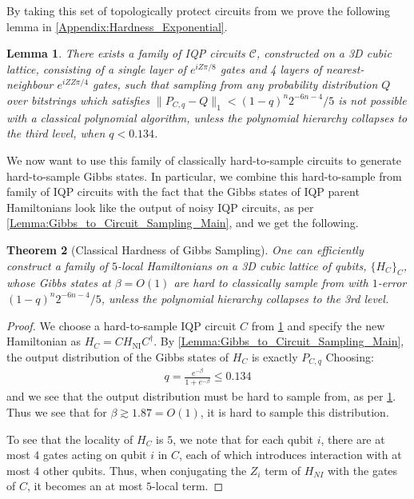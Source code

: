 \documentclass[a4paper,onecolumn,11pt,accepted=2017-05-09]{quantumarticle}
\newcommand{\HNI}{H_{\text{NI}}}
\newtheorem{theorem}{Theorem}
\newtheorem{lemma}[theorem]{Lemma}
\begin{document}
    
	By taking this set of topologically protect circuits from \citeauthor{fujii2016computational} we prove the following lemma in  \cref{Appendix:Hardness_Exponential}.
	\begin{lemma}  \label{Lemma:Hardness_Exponential}
		There exists a family of IQP circuits $\mathcal{C}$, constructed on a 3D cubic lattice, consisting of a single layer of $e^{iZ\pi/8}$ gates and 4 layers of nearest-neighbour $e^{iZZ\pi/4}$ gates, such that sampling from any probability distribution $Q$ over bitstrings which satisfies $\|P_{C,q}-Q\|_{1} < (1-q)^n2^{-6n-4}/5$ is not possible with a classical polynomial algorithm, unless the polynomial hierarchy collapses to the third level, when $q < 0.134$.
	\end{lemma}
 
	\noindent
    We now want to use this family of classically hard-to-sample circuits to generate hard-to-sample Gibbs states.
    In particular, we combine this hard-to-sample from family of IQP circuits with the fact that the Gibbs states of IQP parent Hamiltonians look like the output of noisy IQP circuits, as per \cref{Lemma:Gibbs_to_Circuit_Sampling_Main}, and we get the following.
 
	\begin{theorem}[Classical Hardness of Gibbs Sampling] \label{Theorem:4Local}
		One can efficiently construct a family of $5$-local Hamiltonians on a 3D cubic lattice of qubits, $\{ H_C\}_C$, whose Gibbs states at $\beta = O(1)$ are hard to classically sample from with $1$-error $(1-q)^n2^{-6n-4}/5$, unless the polynomial hierarchy collapses to the 3rd level.
	\end{theorem}
	\begin{proof}
		We choose a hard-to-sample IQP circuit $C$ from \cref{Lemma:Hardness_Exponential} and specify the new Hamiltonian as $H_C=C\HNI C^\dagger$. By \cref{Lemma:Gibbs_to_Circuit_Sampling_Main}, the output distribution of the Gibbs states of $H_C$ is exactly $P_{C,q}$
		Choosing:
		\begin{align} \label{Eq:Hardness_Condition}
			q = \frac{e^{-\beta}}{1+e^{-\beta}} \leq 0.134
		\end{align}
		and we see that the output distribution must be hard to sample from, as per \cref{Lemma:Hardness_Exponential}.
		Thus we see that for $\beta \gtrsim 1.87 =  O(1)$, it is hard to sample this distribution. 
  
    To see that the locality of $H_C$ is $5$, we note that for each qubit $i$, there are at most $4$ gates acting on qubit $i$ in $C$, each of which introduces interaction with at most $4$ other qubits. Thus, when conjugating the $Z_i$ term of $H_{NI}$ with the gates of $C$, it becomes an at most $5$-local term.
	\end{proof}
\end{document}

